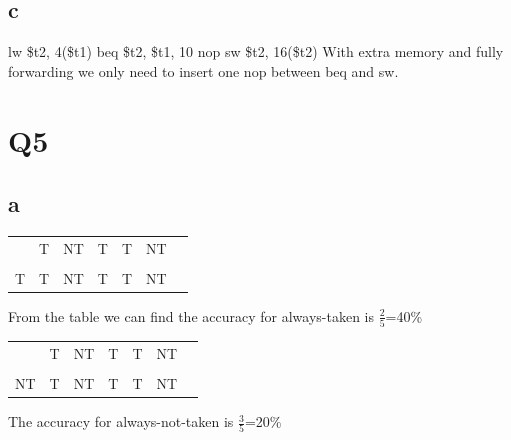 \documentclass[]{article}
\newcommand{\cmark}{\ding{51}}%
\newcommand{\xmark}{\ding{55}}%
\begin{document}
\subsection*{c}
lw \$t2, 4(\$t1) \newline
beq \$t2, \$t1, 10\newline
nop\newline
sw \$t2, 16(\$t2)\newline
With extra memory and fully forwarding we only need to insert one nop between beq and sw.\newline
\section*{Q5}
\subsection*{a}
\begin{center}
	\begin{tabular}{c c c c c c c}
		&T & NT & T & T & NT \\
        &\cmark&\xmark&\xmark&\cmark&\xmark\\
       T&T & NT & T & T & NT\\
        	
	\end{tabular}

\end{center}
From the table we can find the accuracy for always-taken is $\frac{2}{5}$=40\%\newline
\begin{center}
	\begin{tabular}{c c c c c c c}
		&T & NT & T & T & NT \\
		&\xmark& \xmark &\xmark&\cmark &\xmark\\
	 NT &T & NT & T & T & NT\\		
	\end{tabular}
\end{center}
The accuracy for always-not-taken is $\frac{3}{5}$=20\%\newline
\end{document}
